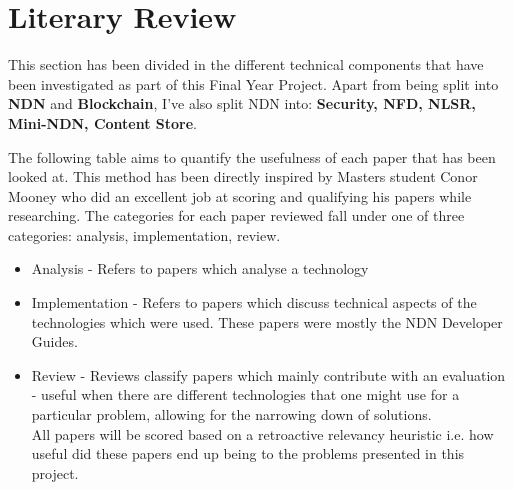 \section{Literary Review}
This section has been divided in the different technical components that have been investigated as part of this Final Year Project. Apart from being split into \textbf{NDN} and \textbf{Blockchain}, I've also split NDN into: \textbf{Security, NFD, NLSR, Mini-NDN, Content Store}.

The following table aims to quantify the usefulness of each paper that has been looked at. This method has been directly inspired by Masters student Conor Mooney who did an excellent job at scoring and qualifying his papers while researching. The categories for each paper reviewed fall under one of three categories: analysis, implementation, review.\\
\begin{itemize}
\item Analysis - Refers to papers which analyse a technology\\
\item Implementation - Refers to papers which discuss technical aspects of the technologies which were used. These papers were mostly the NDN Developer Guides.\\
\item Review - Reviews classify papers which mainly contribute with an evaluation - useful when there are different technologies that one might use for a particular problem, allowing for the narrowing down of solutions.\\
All papers will be scored based on a retroactive relevancy heuristic i.e. how useful did these papers end up being to the problems presented in this project. 
\end{itemize}
